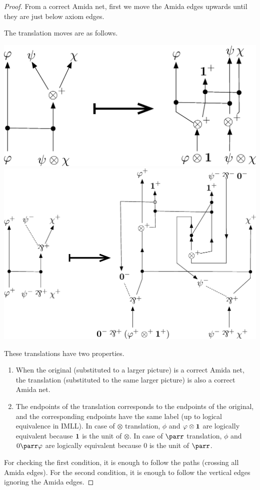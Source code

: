  \begin{proof}
  From a correct Amida net, first we move the Amida edges upwards
  until they are just below axiom edges.

The translation moves are as follows.
 \begin{center}
\includegraphics[scale=0.4]{tensor-move.eps}
\\
\includegraphics[scale=0.35]{parr-move.eps}
 \end{center}
These translations have two properties.
\begin{enumerate}
 \item When the original (substituted to a larger picture)
       is a correct Amida net, the translation (substituted to the same
       larger picture) is also a correct Amida net.
 \item The endpoints of the translation corresponds to the endpoints of
       the original, and the corresponding endpoints have the same label
       (up to logical equivalence in IMLL).  In case of $\otimes$
       translation, $\phi$ and
       $\varphi\otimes \mathbf{1}$ are logically equivalent because $\mathbf{1}$ is the
       unit of $\otimes$.
       In case of $\parr$ translation, $\phi$ and $0\parr \phi$ are
       logically equivalent because $0$ is the unit of $\parr$.
\end{enumerate}
For checking the first condition, it is enough to follow the paths
(crossing all Amida edges).
For the second condition, it is enough to follow the vertical edges
ignoring the Amida edges.


\end{proof}
